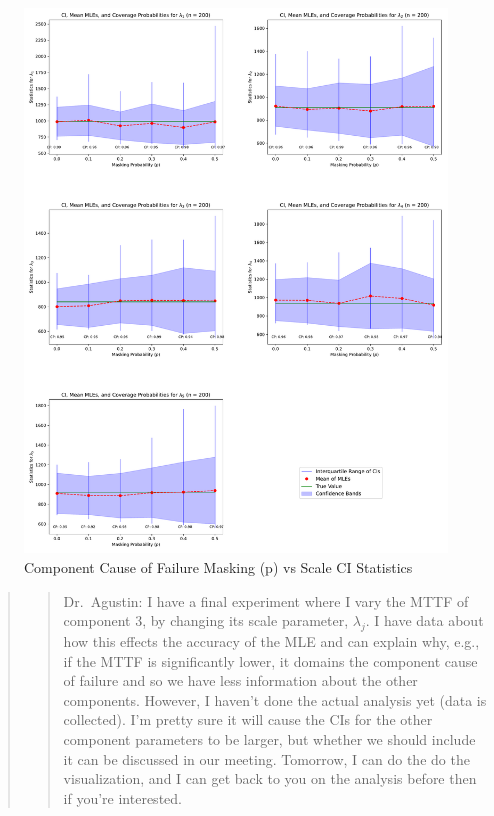 \documentclass[
]{article}
\begin{document}
\begin{figure}

{\centering \includegraphics{image/plot-p-vs-stats-scale} 

}

\caption{Component Cause of Failure Masking (p) vs Scale CI Statistics}\label{fig:masking-prob-vs-stats-scale}
\end{figure}

\begin{quote}
\begin{quote}
Dr.~Agustin: I have a final experiment where I vary the MTTF of
component 3, by changing its scale parameter, \(\lambda_j\). I have data
about how this effects the accuracy of the MLE and can explain why,
e.g., if the MTTF is significantly lower, it domains the component cause
of failure and so we have less information about the other components.
However, I haven't done the actual analysis yet (data is collected). I'm
pretty sure it will cause the CIs for the other component parameters to
be larger, but whether we should include it can be discussed in our
meeting. Tomorrow, I can do the do the visualization, and I can get back
to you on the analysis before then if you're interested.
\end{quote}
\end{quote}
\end{document}
